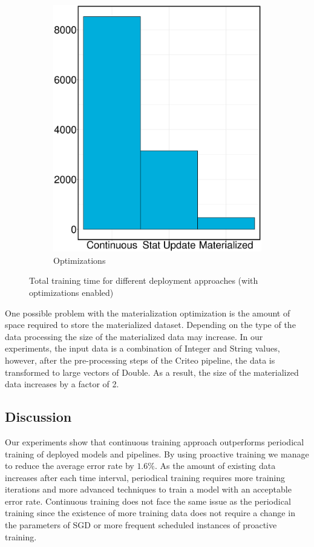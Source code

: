 \begin{figure}[h]
\begin{subfigure}{\columnwidth/2}
\includegraphics[width=\columnwidth]{../images/experiment-results/criteo-training-time-optimizations-experiment.eps}
\caption{Optimizations}
\label{fig:training-time-optimization}
\end{subfigure}
\vspace{2mm}
\caption{Total training time for different deployment approaches (with optimizations enabled)}
\end{figure}

One possible problem with the materialization optimization is the amount of space required to store the materialized dataset.
Depending on the type of the data processing the size of the materialized data may increase.
In our experiments, the input data is a combination of Integer and String values, however, after the pre-processing steps of the Criteo pipeline, the data is transformed to large vectors of Double.
As a result, the size of the materialized data increases by a factor of 2.


\subsection{Discussion} \label{subsec:discussion}
Our experiments show that continuous training approach outperforms periodical training of deployed models and pipelines.
By using proactive training we manage to reduce the average error rate by $1.6\%$.
As the amount of existing data increases after each time interval, periodical training requires more training iterations and more advanced techniques to train a model with an acceptable error rate.
Continuous training does not face the same issue as the periodical training since the existence of more training data does not require a change in the parameters of SGD or more frequent scheduled instances of proactive training. 

